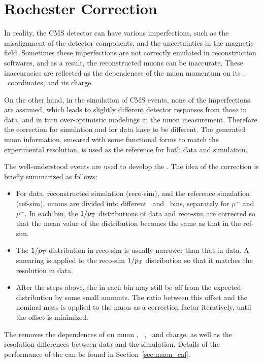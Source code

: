 \section{Rochester Correction} \label{sec:Roch_corr}

In reality, the CMS detector can have various imperfections, 
such as the misalignment of the detector components, and the uncertainties in the magnetic field.
Sometimes these imperfections are not correctly emulated in reconstruction softwares, 
and as a result, the reconstructed muons can be inaccurate.
These inaccuracies are reflected as the dependences of the muon momentum on its \eta, \phi ~coordinates, and its charge.

On the other hand, in the simulation of CMS events, none of the imperfections are assumed,
which leads to slightly different detector responses from those in data, and in turn over-optimistic modelings in the muon measurement. 
Therefore the correction for simulation and for data have to be different.
The generated muon information, smeared with some functional forms to match the experimental resolution, 
is used as the reference for both data and simulation. 

The well-understood \zmm events are used to develop the \RochCorr. 
The idea of the correction is briefly summarized as follows:
\begin{itemize}
  \item For data, reconstructed simulation (reco-sim), and the reference simulation (ref-sim), 
        muons are divided into different \eta ~and \phi ~bins, separately for $\mu^{+}$ and $\mu^{-}$.
        In each bin, the $1/p_{\mathrm{T}}$ distributions of data and reco-sim are corrected so that the mean value of the distribution becomes the same as that in the ref-sim.
  \item The $1/p_{\mathrm{T}}$ distribution in reco-sim is usually narrower than that in data. 
        A smearing is applied to the reco-sim $1/p_{\mathrm{T}}$ distribution so that it matches the resolution in data.
  \item After the steps above, the \mmm in each bin may still be off from the expected distribution by some small amounts.
        The ratio between this offset and the nominal \PZ mass is applied to the muon \pt as a correction factor iteratively, until the offset is minimized.
\end{itemize}
The \RochCorr removes the dependences of \mmm on muon \eta,~ \phi,~ and charge, 
as well as the \mmm resolution differences between data and the simulation.
Details of the performance of the \RochCorr can be found in Section~\ref{sec:muon_cal}.


